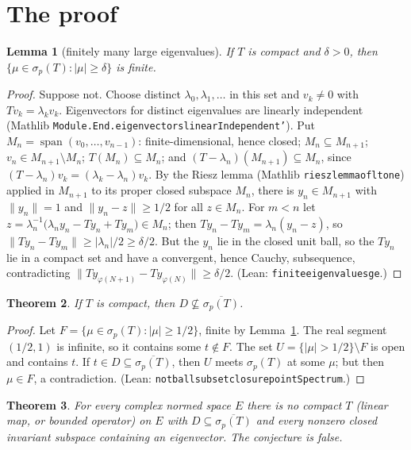 \documentclass[11pt]{article}
\newtheorem{theorem}{Theorem}
\newtheorem{lemma}[theorem]{Lemma}
\theoremstyle{definition}
\theoremstyle{remark}
\renewcommand{\_}{\oldus\allowbreak}
\begin{document}
\section{The proof}

\begin{lemma}[finitely many large eigenvalues]\label{lem:fin}
If $T$ is compact and $\delta>0$, then $\{\mu\in\sigma_p(T):|\mu|\ge\delta\}$ is finite.
\end{lemma}
\begin{proof}
Suppose not. Choose distinct $\lambda_0,\lambda_1,\dots$ in this set and $v_k\ne0$ with $Tv_k=\lambda_kv_k$.
Eigenvectors for distinct eigenvalues are linearly independent (Mathlib
\texttt{Module.End.eigenvectors\_linearIndependent'}). Put $M_n=\operatorname{span}(v_0,\dots,v_{n-1})$:
finite-dimensional, hence closed; $M_n\subseteq M_{n+1}$; $v_n\in M_{n+1}\setminus M_n$;
$T(M_n)\subseteq M_n$; and $(T-\lambda_n)(M_{n+1})\subseteq M_n$, since
$(T-\lambda_n)v_k=(\lambda_k-\lambda_n)v_k$.
By the Riesz lemma (Mathlib \texttt{riesz\_lemma\_of\_lt\_one}) applied in $M_{n+1}$ to its proper closed
subspace $M_n$, there is $y_n\in M_{n+1}$ with $\|y_n\|=1$ and $\|y_n-z\|\ge1/2$ for all $z\in M_n$.
For $m<n$ let $z=\lambda_n^{-1}\bigl(\lambda_ny_n-Ty_n+Ty_m\bigr)\in M_n$; then
$Ty_n-Ty_m=\lambda_n(y_n-z)$, so $\|Ty_n-Ty_m\|\ge|\lambda_n|/2\ge\delta/2$.
But the $y_n$ lie in the closed unit ball, so the $Ty_n$ lie in a compact set and have a convergent,
hence Cauchy, subsequence, contradicting $\|Ty_{\varphi(N+1)}-Ty_{\varphi(N)}\|\ge\delta/2$.
(Lean: \texttt{finite\_eigenvalues\_ge}.)
\end{proof}

\begin{theorem}\label{thm:main}
If $T$ is compact, then $D\not\subseteq\overline{\sigma_p(T)}$.
\end{theorem}
\begin{proof}
Let $F=\{\mu\in\sigma_p(T):|\mu|\ge1/2\}$, finite by Lemma~\ref{lem:fin}. The real segment $(1/2,1)$ is
infinite, so it contains some $t\notin F$. The set $U=\{|\mu|>1/2\}\setminus F$ is open and contains $t$.
If $t\in D\subseteq\overline{\sigma_p(T)}$, then $U$ meets $\sigma_p(T)$ at some $\mu$; but then $\mu\in F$,
a contradiction. (Lean: \texttt{not\_ball\_subset\_closure\_pointSpectrum}.)
\end{proof}

\begin{theorem}
For every complex normed space $E$ there is no compact $T$ (linear map, or bounded operator) on $E$ with
$D\subseteq\overline{\sigma_p(T)}$ and every nonzero closed invariant subspace containing an eigenvector.
The conjecture is false.
\end{theorem}
\end{document}
